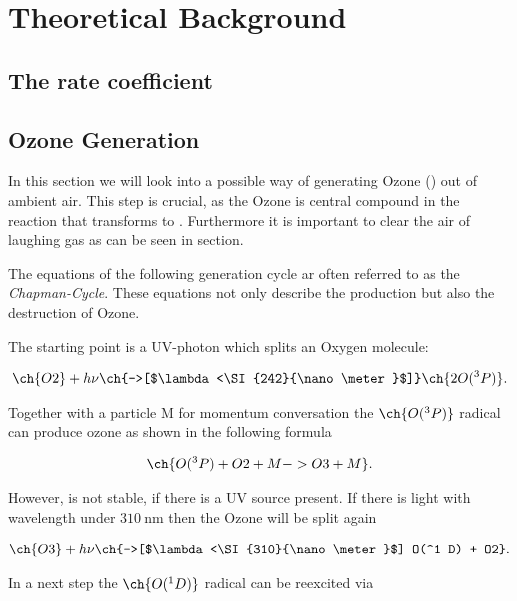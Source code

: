 
\section{Theoretical Background}
\label{sec:theory}

\subsection{The rate coefficient}
\label{sec:rate}



\subsection{Ozone Generation}
\label{sec:theory-ozone}

In this section we will look into a possible way of generating Ozone
() out of ambient air. This step is crucial, as the Ozone is
central compound in the reaction that transforms  to
. Furthermore it is important to clear the air of laughing
gas as can be seen in section.

The equations of the following generation cycle ar often referred to
as the \emph{Chapman-Cycle}. These equations not only
describe the production but also the destruction of Ozone.

The starting point is a UV-photon which splits an Oxygen molecule:

\begin{align*}
  \ch{O2} + h\nu \ch{->[$\lambda<\SI{242}{\nano\meter}$]} \ch{2 O(^3P)}.
\end{align*}

Together with a particle M for momentum conversation the $\ch{O(^3
  P)}$ radical can produce ozone as shown in the following formula

\begin{align}
  \ch{O(^3 P) + O2 + M -> O3 + M}. \label{eq:ozone}
\end{align}

However,  is not stable, if there is a UV source present. If
there is light with wavelength under $\SI{310}{\nano\meter}$ then the
Ozone will be split again

\begin{align}
  \ch{O3} + h\nu \ch{->[$\lambda<\SI{310}{\nano\meter}$] O(^1 D) +
  O2}. \label{eq:split}
\end{align}

In a next step the $\ch{O(^1 D)}$ radical can be reexcited via

